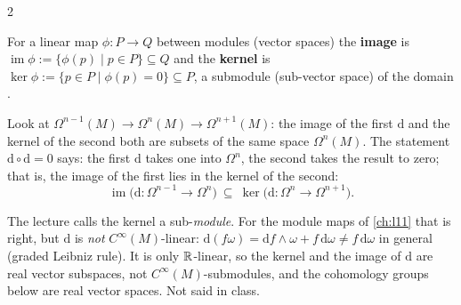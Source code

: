 \begin{paracol}{2}
\begin{definition}\label{def:gr-imker}
For a linear map $\phi\colon P\to Q$ between modules (vector spaces) the \textbf{image} is $\operatorname{im}\phi:=\{\phi(p)\mid p\in P\}\subseteq Q$ and the \textbf{kernel} is $\ker\phi:=\{p\in P\mid\phi(p)=0\}\subseteq P$, a submodule (sub-vector space) of the domain     .
\end{definition}
Look at $\Omega^{n-1}(M)\to\Omega^n(M)\to\Omega^{n+1}(M)$: the image of the first $\mathrm d$ and the kernel of the second both are subsets of the same space $\Omega^n(M)$. The statement $\mathrm d\circ\mathrm d=0$ says: the first $\mathrm d$ takes one into $\Omega^n$, the second takes the result to zero; that is, the image of the first lies in the kernel of the second:
\[
  \operatorname{im}\bigl(\mathrm d\colon\Omega^{n-1}\to\Omega^n\bigr)\ \subseteq\ \ker\bigl(\mathrm d\colon\Omega^n\to\Omega^{n+1}\bigr).
\]
      
\begin{coursenote}
The lecture calls the kernel a sub-\emph{module}. For the module maps of \cref{ch:l11} that is right, but $\mathrm d$ is \emph{not} $C^\infty(M)$-linear: $\mathrm d(f\omega)=\mathrm df\wedge\omega+f\,\mathrm d\omega\ne f\,\mathrm d\omega$ in general (graded Leibniz rule). It is only $\mathbb{R}$-linear, so the kernel and the image of $\mathrm d$ are real vector subspaces, not $C^\infty(M)$-submodules, and the cohomology groups below are real vector spaces. Not said in class.
\end{coursenote}


\end{paracol}
